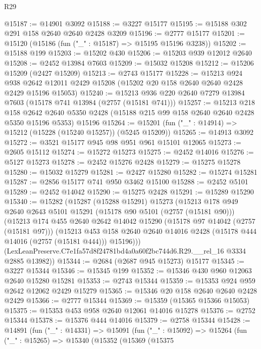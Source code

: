\begin{lexlean}{R29}
\begin{coremodule}
@15187 := @14901 @3092
@15188 := @3227 @15177
@15195 := @15188 @302 @291 @158 @2640 @2640 @2428 @3209
@15196 := @2777 @15177
@15201 := @15120 (@15186 (fun ("_" : @15187) => @15195 @15196 @3238))
@15202 := @15188 @199
@15203 := @15202 @430
@15206 := @15203 @939 @12012 @2640
@15208 := @2452 @13984 @7603
@15209 := @15032 @15208
@15212 := @15206 @15209 (@2427 @15209)
@15213 := @2743 @15177
@15228 := @15213
    @924
    @938
    @2642
    @12011
    @2429
    @15208
    (@15202 @20 @158 @2640 @2640 @2428 @2429 @15196 @15053)
@15240 := @15213 @936 @220 @2640 @7279 @13984 @7603 (@15178 @741 @13984 (@2757 (@15181 @741)))
@15257 := @15213
    @218
    @158
    @2642
    @2640
    @5350
    @2428
    (@15188 @215 @99 @158 @2640 @2640 @2428 @5350 @15196 @5353)
    @15196
@15264 := @15201 (fun ("_" : @14914) => @15212 (@15228 (@15240 @15257)) (@5245 @15209))
@15265 := @14913 @3092
@15272 := @3521 @15177 @945 @98 @951 @961 @15101 @12065
@15273 := @2605 @15112
@15274 := @15272 @15273
@15275 := @2452 @14016
@15276 := @5127 @15273
@15278 := @2452 @15276 @2428
@15279 := @15275 @15278
@15280 := @15032 @15279
@15281 := @2427 @15280
@15282 := @15274 @15281
@15287 := @2856 @15177 @741 @950 @3462 @15100
@15288 := @2452 @5101
@15289 := @2452 @14042
@15290 := @15275 @2428
@15291 := @15289 @15290
@15340 := @15282
    (@15287
      (@15288 @15291)
      @15273
      (@15213
        @178
        @949
        @2640
        @2643
        @5101
        @15291
        (@15178 @90 @5101 (@2757 (@15181 @90)))
        (@15213
          @174
          @455
          @2640
          @2642
          @14042
          @15290
          (@15178 @97 @14042 (@2757 (@15181 @97)))
          (@15213
            @453
            @158
            @2640
            @2640
            @14016
            @2428
            (@15178 @444 @14016 (@2757 (@15181 @444)))
            @15196)))
      (LexLeanPreserve.C7e1fa57d8f24781bd4a0a60f2bc744d6.R29.__rel_16 @3334 @2885 @13982))
@15344 := @2684 (@2687 @945 @15273) @15177
@15345 := @3227 @15344
@15346 := @15345 @199
@15352 := @15346 @430 @960 @12063 @2640 @15280 @15281
@15353 := @2743 @15344
@15359 := @15353 @924 @959 @2642 @12062 @2429 @15279
@15365 := @15346 @20 @158 @2640 @2640 @2428 @2429
@15366 := @2777 @15344
@15369 := @15359 (@15365 @15366 @15053)
@15375 := @15353 @453 @958 @2640 @12061 @14016 @15278
@15376 := @2752 @15344
@15378 := @15376 @444 @14016
@15379 := @2758 @15344
@15428 := @14891
    (fun ("_" : @14331) =>
    @15091
      (fun ("_" : @15092) =>
      @15264
        (fun ("_" : @15265) =>
        @15340
          (@15352
            (@15369
              (@15375

\end{coremodule}
\end{lexlean}

